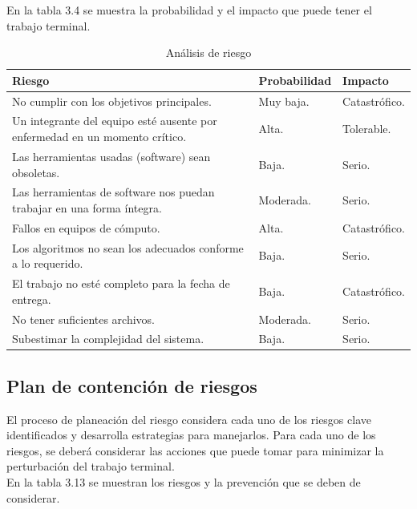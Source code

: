 \documentclass[12pt]{report}
\begin{document}
En la tabla 3.4 se muestra la probabilidad y el impacto que puede tener el trabajo terminal.\\

\begin{table}[H]
\begin{center}
\begin{tabular}{|p{60mm}|p{25mm}|p{25mm}|}
\hline
 Riesgo & Probabilidad & Impacto \\
\hline \hline 
No cumplir con los objetivos principales. & Muy baja. & Catastrófico.\\
\hline
Un integrante del equipo esté ausente por enfermedad en un momento crítico. & Alta. & Tolerable.\\
\hline
Las herramientas usadas (software) sean obsoletas. & Baja. & Serio.\\
\hline
Las herramientas de software nos puedan trabajar en una forma íntegra. & Moderada. & Serio.\\
\hline
Fallos en equipos de cómputo. & Alta. & Catastrófico.\\
\hline
Los algoritmos no sean los adecuados conforme a lo requerido. & Baja. & Serio. \\
\hline
El trabajo no esté completo para la fecha de entrega. & Baja. & Catastrófico.\\
\hline
No tener suficientes archivos. & Moderada. & Serio.\\
\hline
Subestimar la complejidad del sistema. & Baja. & Serio.\\
\hline
\end{tabular}
\caption{Análisis de riesgo}
\end{center}
\end{table}

\subsection{Plan de contención de riesgos}
El proceso de planeación del riesgo considera cada uno de los riesgos clave identificados y desarrolla estrategias para manejarlos. Para cada uno de los riesgos, se deberá considerar las acciones que puede tomar para minimizar la perturbación del trabajo terminal.\\

En la tabla 3.13 se muestran los riesgos y la prevención que se deben de considerar.
\end{document}
